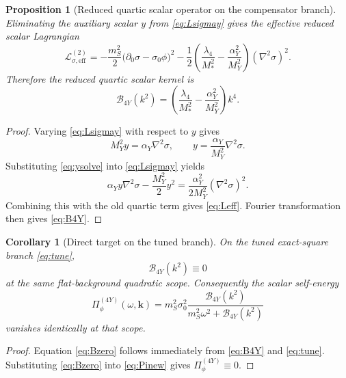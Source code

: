 \documentclass[11pt]{article}
\newtheorem{proposition}{Proposition}
\newtheorem{corollary}{Corollary}
\begin{document}
\begin{proposition}[Reduced quartic scalar operator on the compensator branch]
\label{prop:reduce}
Eliminating the auxiliary scalar \(y\) from \eqref{eq:Lsigmay} gives the effective reduced scalar Lagrangian
\begin{equation}
\mathcal L_{\sigma,\mathrm{eff}}^{(2)}
=
-\frac{m_S^2}{2}\bigl(\partial_0\sigma-\sigma_0\phi\bigr)^2
-\frac{1}{2}
\left(
\frac{\lambda_4}{M_*^2}
-\frac{\alpha_Y^2}{M_Y^2}
\right)
(\nabla^2\sigma)^2.
\label{eq:Leff}
\end{equation}
Therefore the reduced quartic scalar kernel is
\begin{equation}
\mathcal B_{4Y}(k^2)
=
\left(
\frac{\lambda_4}{M_*^2}
-\frac{\alpha_Y^2}{M_Y^2}
\right)k^4.
\label{eq:B4Y}
\end{equation}
\end{proposition}

\begin{proof}
Varying \eqref{eq:Lsigmay} with respect to \(y\) gives
\begin{equation}
M_Y^2y=\alpha_Y\nabla^2\sigma,
\qquad
y=\frac{\alpha_Y}{M_Y^2}\nabla^2\sigma.
\label{eq:ysolve}
\end{equation}
Substituting \eqref{eq:ysolve} into \eqref{eq:Lsigmay} yields
\[
\alpha_Y y\nabla^2\sigma-\frac{M_Y^2}{2}y^2
=
\frac{\alpha_Y^2}{2M_Y^2}(\nabla^2\sigma)^2.
\]
Combining this with the old quartic term gives \eqref{eq:Leff}. Fourier transformation then gives \eqref{eq:B4Y}.
\end{proof}

\begin{corollary}[Direct target on the tuned branch]
\label{cor:target}
On the tuned exact-square branch \eqref{eq:tune},
\begin{equation}
\mathcal B_{4Y}(k^2)\equiv 0
\label{eq:Bzero}
\end{equation}
at the same flat-background quadratic scope. Consequently the scalar self-energy
\begin{equation}
\Pi_\phi^{(4Y)}(\omega,\mathbf{k})
=
m_S^2\sigma_0^2
\frac{\mathcal B_{4Y}(k^2)}
{m_S^2\omega^2+\mathcal B_{4Y}(k^2)}
\label{eq:Pinew}
\end{equation}
vanishes identically at that scope.
\end{corollary}

\begin{proof}
Equation \eqref{eq:Bzero} follows immediately from \eqref{eq:B4Y} and \eqref{eq:tune}. Substituting \eqref{eq:Bzero} into \eqref{eq:Pinew} gives \(\Pi_\phi^{(4Y)}\equiv 0\).
\end{proof}
\end{document}
